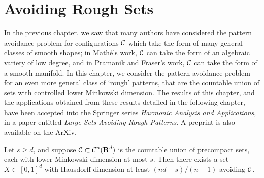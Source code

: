 
\chapter{Avoiding Rough Sets}
\label{ch:RoughSets}

In the previous chapter, we saw that many authors have considered the pattern avoidance problem for configurations $\operatorname{\mathcal{C}}$ which take the form of many general classes of smooth shapes; in Math\'{e}'s work, $\operatorname{\mathcal{C}}$ can take the form of an algebraic variety of low degree, and in Pramanik and Fraser's work, $\operatorname{\mathcal{C}}$ can take the form of a smooth manifold. In this chapter, we consider the pattern avoidance problem for an even more general class of `rough' patterns, that are the countable union of sets with controlled lower Minkowski dimension. The results of this chapter, and the applications obtained from these results detailed in the following chapter, have been accepted into the Springer series \emph{Harmonic Analysis and Applications}, in a paper entitled \emph{Large Sets Avoiding Rough Patterns}. A preprint \cite{roughSetsAvoidingPatterns} is also available on the ArXiv.
%
\begin{theorem}\label{mainTheorem}
	Let $s \geq d$, and suppose $\operatorname{\mathcal{C}} \subset \operatorname{\mathcal{C}}^n(\operatorname{\mathbf{R}}^d)$ is the countable union of precompact sets, each with lower Minkowski dimension at most $s$. Then there exists a set $X \subset [0,1]^d$ with Hausdorff dimension at least $(nd - s)/(n-1)$ avoiding $\operatorname{\mathcal{C}}$.
\end{theorem}

